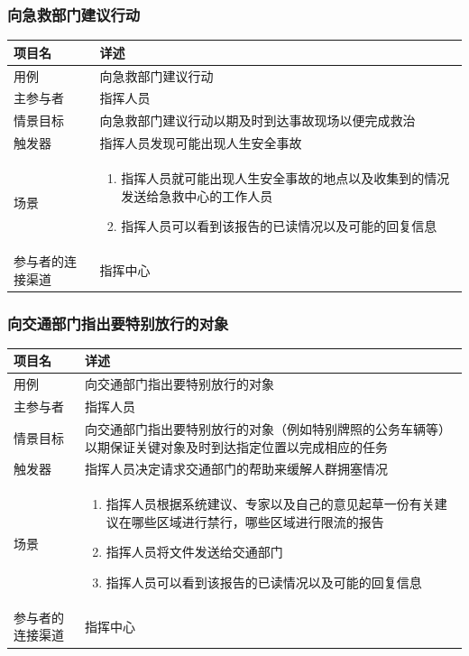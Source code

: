 \documentclass{ctexrep}
\begin{document}
\subsubsection{向急救部门建议行动}
\begin{longtable}{p{2cm} | p{10cm}}
\hline
项目名 & 详述 \\
\hline
\hline
用例 & 向急救部门建议行动\\
\hline
主参与者 & 指挥人员 \\
\hline
情景目标 & 向急救部门建议行动以期及时到达事故现场以便完成救治 \\
\hline
触发器 & 指挥人员发现可能出现人生安全事故 \\
\hline
场景 & \begin{enumerate}
	\item 指挥人员就可能出现人生安全事故的地点以及收集到的情况发送给急救中心的工作人员
	\item 指挥人员可以看到该报告的已读情况以及可能的回复信息
\end{enumerate} \\
\hline
参与者的连接渠道 & 指挥中心 \\
\hline
\end{longtable}

\subsubsection{向交通部门指出要特别放行的对象}
\begin{longtable}{p{2cm} | p{10cm}}
\hline
项目名 & 详述 \\
\hline
\hline
用例 & 向交通部门指出要特别放行的对象\\
\hline
主参与者 &指挥人员 \\
\hline
情景目标 &  向交通部门指出要特别放行的对象（例如特别牌照的公务车辆等）以期保证关键对象及时到达指定位置以完成相应的任务\\
\hline
触发器 &  指挥人员决定请求交通部门的帮助来缓解人群拥塞情况\\
\hline
场景 & \begin{enumerate}
	\item 指挥人员根据系统建议、专家以及自己的意见起草一份有关建议在哪些区域进行禁行，哪些区域进行限流的报告
	\item 指挥人员将文件发送给交通部门
		\item 指挥人员可以看到该报告的已读情况以及可能的回复信息
\end{enumerate} \\
\hline
参与者的连接渠道 & 指挥中心 \\
\hline
\end{longtable}
\end{document}
